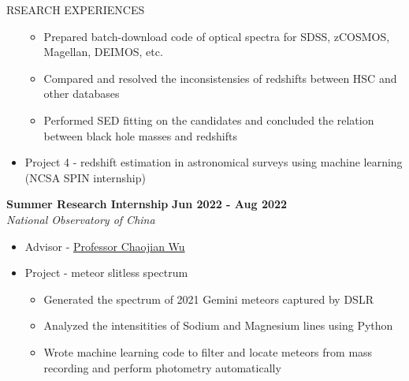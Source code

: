 \documentclass[10pt]{article} %
\begin{document}
\begin{section}{RSEARCH EXPERIENCES}
\begin{itemize}[leftmargin=1.5em]
\begin{itemize}[leftmargin=1.5em]
        \item Prepared batch-download code of optical spectra for SDSS, zCOSMOS, Magellan, DEIMOS, etc. 
        \item Compared and resolved the inconsistensies of redshifts between HSC and other databases
        \item Performed SED fitting on the candidates and concluded the relation between black hole masses and redshifts
    \end{itemize}
    \item Project 4 - redshift estimation in astronomical surveys using machine learning (NCSA SPIN internship)
\end{itemize}

\textbf{Summer Research Internship} \hfill \textbf{Jun 2022 - Aug 2022} \\
\textit{National Observatory of China}
\begin{itemize}[leftmargin=1.5em]
    \item Advisor - \href{mailto:chjwu@bao.ac.cn}{Professor Chaojian Wu}
    \item Project - meteor slitless spectrum
    \begin{itemize}[leftmargin=1.5em]
        \item Generated the spectrum of 2021 Gemini meteors captured by DSLR
        \item Analyzed the intensitities of Sodium and Magnesium lines using Python
        \item Wrote machine learning code to filter and locate meteors from mass recording and perform photometry automatically
    \end{itemize}
\end{itemize}

\newpage


\end{section}
\end{document}
